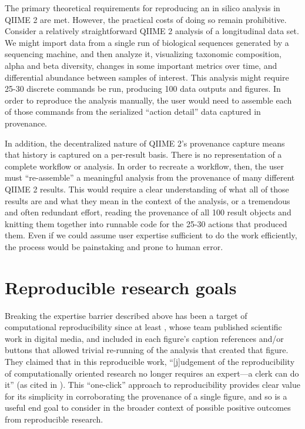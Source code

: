 The primary theoretical requirements for reproducing an in silico analysis in
QIIME 2 are met. However, the practical costs of doing so remain prohibitive.
Consider a relatively straightforward QIIME 2 analysis of a longitudinal data
set. We might import data from a single run of biological sequences generated by
a sequencing machine, and then analyze it, visualizing taxonomic composition,
alpha and beta diversity, changes in some important metrics over time, and
differential abundance between samples of interest. This analysis might require
25-30 discrete commands be run, producing 100 data outputs and figures. In order
to reproduce the analysis manually, the user would need to assemble each of
those commands from the serialized “action detail” data captured in provenance. 

In addition, the decentralized nature of QIIME 2’s provenance capture means that
history is captured on a per-result basis. There is no representation of a
complete workflow or analysis. In order to recreate a workflow, then, the user
must “re-assemble” a meaningful analysis from the provenance of many different
QIIME 2 results. This would require a clear understanding of what all of those
results are and what they mean in the context of the analysis, or a tremendous
and often redundant effort, reading the provenance of all 100 result objects and
knitting them together into runnable code for the 25-30 actions that produced
them. Even if we could assume user expertise sufficient to do the work
efficiently, the process would be painstaking and prone to human error. 

\section{Reproducible research goals}
\label{section:repro_goals}

Breaking the expertise barrier described above has been a target of
computational reproducibility since at least \textcite{claerbout_electronic_1992},
whose team published scientific work in digital media, and included in each figure’s
caption references and/or buttons that allowed trivial re-running of the
analysis that created that figure. They claimed that in this reproducible work,
“[j]udgement of the reproducibility of computationally oriented research no
longer requires an expert—a clerk can do it” (as cited in \cite[76]{plesser_reproducibility_2018}).
This “one-click” approach to reproducibility provides clear value for its
simplicity in corroborating the provenance of a single figure, and so is a
useful end goal to consider in the broader context of possible positive outcomes
from reproducible research.

